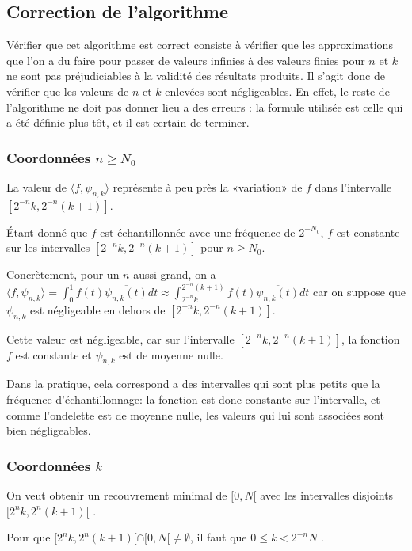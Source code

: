 \subsection{Correction de l'algorithme}

Vérifier que cet algorithme est correct consiste à vérifier que les approximations que l'on a du faire pour passer de valeurs infinies à des valeurs finies pour $n$ et $k$ ne sont pas préjudiciables à la validité des résultats produits. Il s'agit donc de vérifier que les valeurs de $n$ et $k$ enlevées sont négligeables. En effet,  le reste de l'algorithme ne doit pas donner lieu a des erreurs : la formule utilisée est celle qui a été définie plus tôt, et il est certain de terminer. 

\subsubsection{Coordonnées $n\geqslant N_0$}

La valeur de $\langle f,\psi_{n,k}\rangle$ représente à peu près la «variation» de $f$ dans l'intervalle $[2^{-n}k,2^{-n}(k+1)]$.

Étant donné que $f$ est échantillonnée avec une fréquence de $2^{-N_0}$, $f$ est constante sur les intervalles $[2^{-n}k,2^{-n}(k+1)]$ pour $n\geqslant N_0$.

Concrètement, pour un $n$ aussi grand, on a $\langle f,\psi_{n,k}\rangle = \int_0^1 f(t) \overline{\psi_{n, k}(t)}dt \approx \int_{2^{-n}k}^{2^{-n}(k+1)} f(t) \overline{\psi_{n, k}(t)}dt$ car on suppose que $\psi_{n,k}$ est négligeable en dehors de $[2^{-n}k,2^{-n}(k+1)]$.

Cette valeur est négligeable, car sur l'intervalle $[2^{-n}k,2^{-n}(k+1)]$, la fonction $f$ est constante et $\psi_{n,k}$ est de moyenne nulle.

Dans la pratique, cela correspond a des intervalles qui sont plus petits que la fréquence d'échantillonnage: la fonction est donc constante sur l'intervalle, et comme l'ondelette est de moyenne nulle, les valeurs qui lui sont associées sont bien négligeables. 

\subsubsection{Coordonnées $k$}

On veut obtenir un recouvrement minimal de $[0,N[$ avec les intervalles disjoints $[2^{n}k,2^{n}(k+1)[$ .

Pour que $[2^{n}k,2^{n}(k+1)[\cap[0,N[\neq\emptyset$, il faut que $0\le k< 2^{-n}N$ .


